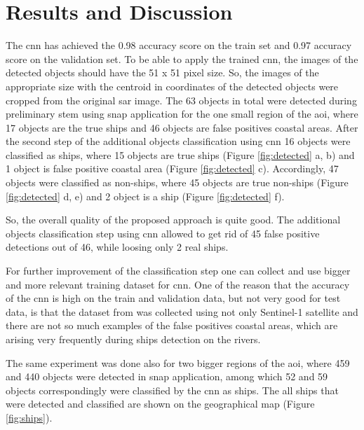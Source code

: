 \section{Results and Discussion}

The \gls{cnn} has achieved the 0.98 accuracy score on the train set and 0.97 accuracy score on the validation set. To be able to apply the trained \gls{cnn}, the images of the detected objects should have the 51 x 51 pixel size. So, the images of the appropriate size with the centroid in coordinates of the detected objects were cropped from the original \gls{sar} image. The 63 objects in total were detected during preliminary stem using \gls{snap} application for the one small region of the \gls{aoi}, where 17 objects are the true ships and 46 objects are false positives coastal areas. After the second step of the additional objects classification using \gls{cnn} 16 objects were classified as ships, where 15 objects are true ships (Figure \ref{fig:detected} a, b) and 1 object is false positive coastal area (Figure \ref{fig:detected} c). Accordingly, 47 objects were classified as non-ships, where 45 objects are true non-ships (Figure \ref{fig:detected} d, e) and 2 object is a ship (Figure \ref{fig:detected} f).

So, the overall quality of the proposed approach is quite good. The additional objects classification step using \gls{cnn} allowed to get rid of 45 false positive detections out of 46, while loosing only 2 real ships.


For further improvement of the classification step one can collect and use bigger and more relevant training dataset for \gls{cnn}. One of the reason that the accuracy of the \gls{cnn} is high on the train and validation data, but not very good for test data, is that the dataset from \cite{data} was collected using not only Sentinel-1 satellite and there are not so much examples of the false positives coastal areas, which are arising very frequently during ships detection on the rivers.


The same experiment was done also for two bigger regions of the \gls{aoi}, where 459 and 440 objects were detected in \gls{snap} application, among which 52 and 59 objects correspondingly were classified by the \gls{cnn} as ships. The all ships that were detected and classified are shown on the geographical map (Figure \ref{fig:ships}).

